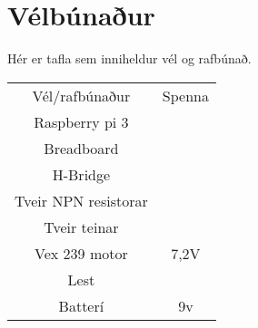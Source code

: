 \section{Vélbúnaður}
Hér er tafla sem inniheldur vél og rafbúnað.

\begin{center}
\begin{tabular}{ |c|c| } 
 \hline
 Vél/rafbúnaður &Spenna \\ 
 Raspberry pi 3 &\\ 
 Breadboard & \\
 H-Bridge \cite{kanai2011h} & \\
 Tveir NPN resistorar & \\
 Tveir teinar & \\
 Vex 239 motor & 7,2V \\
 Lest & \\
 Batterí & 9v \\
 \hline
\end{tabular}
\end{center}